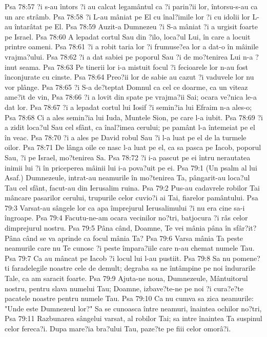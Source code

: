 Psa 78:57  ?i s-au întors ?i au calcat legamântul ca ?i parin?ii lor, întorsu-s-au ca un arc strâmb.
Psa 78:58  ?i L-au mâniat pe El cu înal?imile lor ?i cu idolii lor L-au întarâtat pe El.
Psa 78:59  Auzit-a Dumnezeu ?i S-a mâniat ?i a urgisit foarte pe Israel.
Psa 78:60  A lepadat cortul Sau din ?ilo, loca?ul Lui, în care a locuit printre oameni.
Psa 78:61  ?i a robit taria lor ?i frumuse?ea lor a dat-o în mâinile vrajma?ului.
Psa 78:62  ?i a dat sabiei pe poporul Sau ?i de mo?tenirea Lui n-a ?inut seama.
Psa 78:63  Pe tinerii lor i-a mistuit focul ?i fecioarele lor n-au fost înconjurate cu cinste.
Psa 78:64  Preo?ii lor de sabie au cazut ?i vaduvele lor nu vor plânge.
Psa 78:65  ?i S-a de?teptat Domnul ca cel ce doarme, ca un viteaz ame?it de vin,
Psa 78:66  ?i a lovit din spate pe vrajma?ii Sai; ocara ve?nica le-a dat lor.
Psa 78:67  ?i a lepadat cortul lui Iosif ?i semin?ia lui Efraim n-a ales-o;
Psa 78:68  Ci a ales semin?ia lui Iuda, Muntele Sion, pe care l-a iubit.
Psa 78:69  ?i a zidit loca?ul Sau cel sfânt, ca înal?imea cerului; pe pamânt l-a întemeiat pe el în veac.
Psa 78:70  ?i a ales pe David robul Sau ?i l-a luat pe el de la turmele oilor.
Psa 78:71  De lânga oile ce nasc l-a luat pe el, ca sa pasca pe Iacob, poporul Sau, ?i pe Israel, mo?tenirea Sa.
Psa 78:72  ?i i-a pascut pe ei întru nerautatea inimii lui ?i în priceperea mâinii lui i-a pova?uit pe ei.
Psa 79:1  (Un psalm al lui Asaf.) Dumnezeule, intrat-au neamurile în mo?tenirea Ta, pângarit-au loca?ul Tau cel sfânt, facut-au din Ierusalim ruina.
Psa 79:2  Pus-au cadavrele robilor Tai mâncare pasarilor cerului, trupurile celor cuvio?i ai Tai, fiarelor pamântului.
Psa 79:3  Varsat-au sângele lor ca apa împrejurul Ierusalimului ?i nu era cine sa-i îngroape.
Psa 79:4  Facutu-ne-am ocara vecinilor no?tri, batjocura ?i râs celor dimprejurul nostru.
Psa 79:5  Pâna când, Doamne, Te vei mânia pâna în sfâr?it? Pâna când se va aprinde ca focul mânia Ta?
Psa 79:6  Varsa mânia Ta peste neamurile care nu Te cunosc ?i peste împara?iile care n-au chemat numele Tau.
Psa 79:7  Ca au mâncat pe Iacob ?i locul lui l-au pustiit.
Psa 79:8  Sa nu pomene?ti faradelegile noastre cele de demult; degraba sa ne întâmpine pe noi îndurarile Tale, ca am saracit foarte.
Psa 79:9  Ajuta-ne noua, Dumnezeule, Mântuitorul nostru, pentru slava numelui Tau; Doamne, izbave?te-ne pe noi ?i cura?e?te pacatele noastre pentru numele Tau.
Psa 79:10  Ca nu cumva sa zica neamurile: "Unde este Dumnezeul lor?" Sa se cunoasca între neamuri, înaintea ochilor no?tri,
Psa 79:11  Razbunarea sângelui varsat, al robilor Tai; sa intre înaintea Ta suspinul celor fereca?i. Dupa mare?ia bra?ului Tau, paze?te pe fiii celor omorâ?i.
